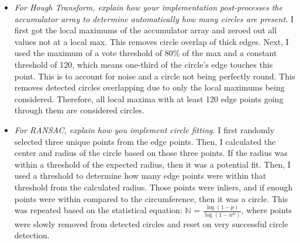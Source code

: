 \documentclass[11pt]{article}
\begin{document}
\begin{itemize}
        \item \textit{For Hough Transform, explain how your implementation post-processes the
        accumulator array to determine automatically how many circles are present.}\newline
        I first got the local maximums of the accumulator array and zeroed out all values not at a local max. This
        removes circle overlap of thick edges. Next, I used the maximum of a vote threshold of 80\% of the max
        and a constant threshold of 120, which means one-third of the
        circle's edge touches this point. This is to account for noise and a circle not being perfectly round. This
        removes detected circles overlapping due to only the local maximums being considered. Therefore, all local
        maxima with at least 120 edge points going through them are considered circles.\newline

        \item \textit{For RANSAC, explain how you implement circle fitting.}\newline
        I first randomly selected three unique points from the edge points. Then, I calculated the center and radius of
        the circle based on those three points. If the radius was within a threshold of the expected radius, then it was
        a potential fit. Then, I used a threshold to determine how many edge points were within that threshold from
        the calculated radius. Those points were inliers, and if enough points were within compared to the
        circumference, then it was a circle. This was repeated based on the statistical equation:
        $\mathbb{N}$ = $\frac{\log(1 - p)}{\log(1 - w^n)}$, where points were slowly removed from detected circles
        and reset on very successful circle detection.\newline


\end{itemize}
\end{document}
